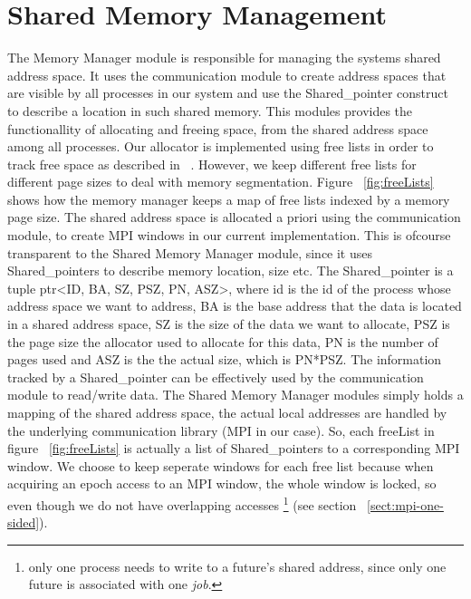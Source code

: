 \section{Shared Memory Management}
\label{sect:shared-memory-manager}
The Memory Manager module is responsible for managing the systems shared address space. 
It uses the communication module to create address spaces that
are visible by all processes in our system and use the Shared\_pointer construct to describe a location in such
shared memory.  This modules provides the functionallity of allocating and freeing space, from the shared address 
space among all processes.  Our allocator is implemented using free lists in order to track free space as 
described in ~\cite[p.~185-187]{Tanenbaum:2007:MOS:1410217}.  
However, we keep different free lists for different page sizes to deal
with memory segmentation. Figure ~\ref{fig:freeLists} shows how the memory manager keeps a map of free lists
indexed by a memory page size.
The shared address space is allocated a priori
using the communication module, to create MPI windows in our current implementation.  This is ofcourse transparent to
the Shared Memory Manager module, since it uses Shared\_pointers to describe memory location, size etc.  
The Shared\_pointer is a tuple  ptr<ID, BA, SZ, PSZ, PN, ASZ>, where id is the id of the process
whose address space we want to address, BA is the base address that the data is located in a shared address space,
SZ is the size of the data we want to allocate, PSZ is the page size the allocator used to allocate for this data,
PN is the number of pages used and ASZ is the the actual size, which is PN*PSZ.  The information tracked by a 
Shared\_pointer can be effectively used by the communication module to read/write data.  The Shared Memory Manager
modules simply holds a mapping of the shared address space, the actual local addresses are handled by the 
underlying communication library (MPI in our case).   
So, each freeList in figure ~\ref{fig:freeLists} is actually a list of 
Shared\_pointers to a corresponding MPI window.  We choose
to keep seperate windows for each free list because when acquiring an epoch access to an MPI window, the whole 
window is locked, so even though we do not have overlapping accesses \footnote{only one process needs to write to a 
future's shared address, since only one future is associated with one \emph{job}.} 
(see section ~\ref{sect:mpi-one-sided}).  


